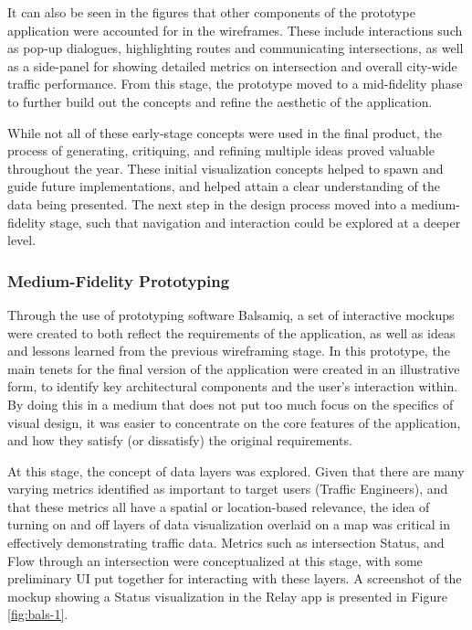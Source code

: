 \documentclass{report}
\begin{document}
It can also be seen in the figures that other components of the prototype application were accounted for in the wireframes.
These include interactions such as pop-up dialogues, highlighting routes and communicating intersections, as well as a side-panel for showing detailed metrics on intersection and overall city-wide traffic performance.
From this stage, the prototype moved to a mid-fidelity phase to further build out the concepts and refine the aesthetic of the application.

While not all of these early-stage concepts were used in the final product, the process of generating, critiquing, and refining multiple ideas proved valuable throughout the year.
These initial visualization concepts helped to spawn and guide future implementations, and helped attain a clear understanding of the data being presented.
The next step in the design process moved into a medium-fidelity stage, such that navigation and interaction could be explored at a deeper level.

\subsubsection{Medium-Fidelity Prototyping}
Through the use of prototyping software Balsamiq, a set of interactive mockups were created to both reflect the requirements of the application, as well as ideas and lessons learned from the previous wireframing stage.
In this prototype, the main tenets for the final version of the application were created in an illustrative form, to identify key architectural components and the user's interaction within.
By doing this in a medium that does not put too much focus on the specifics of visual design, it was easier to concentrate on the core features of the application, and how they satisfy (or dissatisfy) the original requirements. 

At this stage, the concept of data layers was explored.
Given that there are many varying metrics identified as important to target users (Traffic Engineers), and that these metrics all have a spatial or location-based relevance, the idea of turning on and off layers of data visualization overlaid on a map was critical in effectively demonstrating traffic data.
Metrics such as intersection Status, and Flow through an intersection were conceptualized at this stage, with some preliminary UI put together for interacting with these layers.
A screenshot of the mockup showing a Status visualization in the Relay app is presented in Figure \ref{fig:bals-1}. \\
\end{document}
